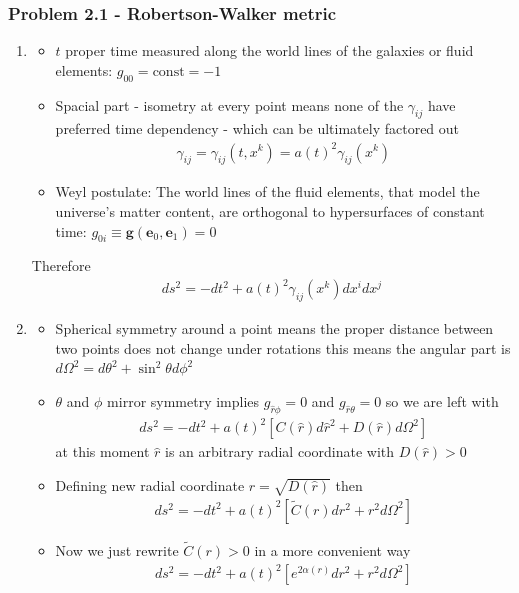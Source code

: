 \documentclass[10pt,a4paper]{article}
\theoremstyle{definition}
\begin{document}
\subsubsection{Problem 2.1 - Robertson-Walker metric}
\begin{enumerate}
\item 
\begin{itemize}
\item $t$ proper time measured along the world lines of the galaxies or fluid elements: $g_{00}=\text{const}=-1$
\item Spacial part - isometry at every point means none of the $\gamma_{ij}$ have preferred time dependency -  which can be ultimately factored out 
\begin{align}
\gamma_{ij}=\gamma_{ij}(t,x^k)=a(t)^2\gamma_{ij}(x^k)
\end{align} 
\item Weyl postulate: The world lines of the fluid elements, that model the universe’s matter content, are orthogonal to hypersurfaces of constant time: $g_{0i}\equiv\mathbf{g}(\mathbf{e}_0,\mathbf{e}_1)=0$
\end{itemize}
Therefore
\begin{align}
ds^2=-dt^2+a(t)^2\gamma_{ij}(x^k)dx^idx^j
\end{align}
\item 
\begin{itemize}
\item Spherical symmetry around a point means the proper distance between two points does not change under rotations this means the angular part is $d\Omega^2=d\theta^2+\sin^2\theta d\phi^2$
\item $\theta$ and $\phi$ mirror symmetry implies $g_{\hat{r}\phi}=0$ and $g_{\hat{r}\theta}=0$ so we are left with
\begin{align}
ds^2=-dt^2+a(t)^2\left[C(\hat{r})d\hat{r}^2+D(\hat{r})d\Omega^2\right]
\end{align}
at this moment $\hat{r}$ is an arbitrary radial coordinate with $D(\hat{r})>0$
\item Defining new radial coordinate $r=\sqrt{D(\hat{r})}$ then
\begin{align}
ds^2=-dt^2+a(t)^2\left[\tilde{C}(r)dr^2+r^2d\Omega^2\right]
\end{align}
\item Now we just rewrite $\tilde{C}(r)>0$ in a more convenient way
\begin{align}
ds^2=-dt^2+a(t)^2\left[e^{2\alpha(r)}dr^2+r^2d\Omega^2\right]
\end{align}

\end{itemize}
\end{enumerate}
\end{document}
